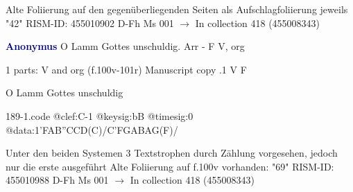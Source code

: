 \documentclass[twocolumn]{book}
\begin{document}
\newline Alte Foliierung auf den gegenüberliegenden Seiten als Aufschlagfoliierung jeweils "42"
\newline RISM-ID: 455010902
\newline D-Fh  Ms 001
\newline $\rightarrow$ In collection 418 (455008343)
      
\newline \par \vspace{7pt} \textcolor{darkblue}{\textbf{Anonymus  }}
\newline O Lamm Gottes unschuldig. Arr - F
\newline V, org
\newline \begin{itshape}\end{itshape} 
\newline \textcolor{darkblue}{}  1 parts: V and org  (f.100v-101r)
\newline Manuscript copy
.1  V  F
\newline \begin{footnotesize} O Lamm Gottes unschuldig \end{footnotesize}  
\begin{filecontents*}{189-1.code}
@clef:C-1
@keysig:bB
@timesig:0
@data:1'FAB''CCD(C)/C'FGABAG(F)/
\end{filecontents*}
\newline
%

\newline Unter den beiden Systemen 3 Textstrophen durch Zählung vorgesehen, jedoch nur die erste ausgeführt
\newline Alte Foliierung auf f.100v vorhanden: "69"
\newline RISM-ID: 455010988
\newline D-Fh  Ms 001
\newline $\rightarrow$ In collection 418 (455008343)
      
\end{document}
